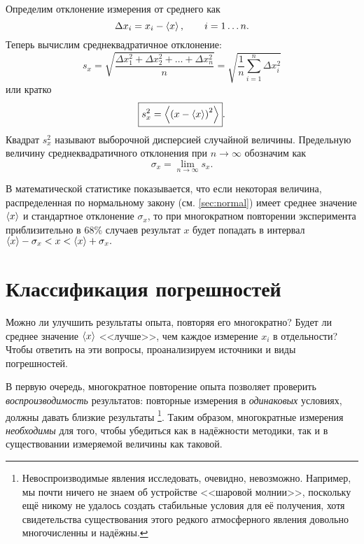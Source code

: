 Определим отклонение измерения от среднего как
\[
\Delta x_{i}=x_{i}-\left<x\right>,\qquad i=1\ldots n.
\]
Теперь вычислим среднеквадратичное отклонение:
\begin{equation}
    s_{x}=\sqrt{\frac{\Delta x_{1}^{2}+\Delta x_{2}^{2}+\ldots+\Delta x_{n}^{2}}{n}}=\sqrt{\frac{1}{n}\sum\limits _{i=1}^{n}\Delta x_{i}^{2}}\label{eq:sigma}
\end{equation}
или кратко
\begin{equation}
    \boxed{s_{x}^{2}=\left<\left(x-\left<x\right>\right)^{2}\right>}.\label{eq:sigma_s}
\end{equation}
Квадрат $s_{x}^{2}$ называют выборочной дисперсией случайной величины. Предельную величину среднеквадратичного отклонения
при $n\to\infty$ обозначим как
\[
\sigma_{x}=\lim\limits _{n\to\infty}s_{x}.
\]

В математической статистике показывается, что если некоторая величина, распределенная по нормальному закону (см. \ref{sec:normal}) имеет среднее значение $\left<x\right>$ и стандартное отклонение $\sigma_x$, то при многократном повторении эксперимента приблизительно в 68\% случаев результат $x$ будет попадать в интервал $\left<x\right>-\sigma_{x}<x<\left<x\right>+\sigma_{x}.$



\section{Классификация погрешностей}

Можно ли улучшить результаты опыта, повторяя его многократно? Будет
ли среднее значение $\left<x\right>$ <<лучше>>,
чем каждое измерение $x_{i}$ в отдельности? Чтобы ответить на эти
вопросы, проанализируем источники и виды погрешностей.

В первую очередь, многократное повторение опыта позволяет проверить
\emph{воспроизводимость} результатов: повторные измерения в \emph{одинаковых}
условиях, должны давать близкие результаты \footnote{Невоспроизводимые явления исследовать, очевидно, невозможно. Например,
мы почти ничего не знаем об устройстве <<шаровой молнии>>,
поскольку ещё никому не удалось создать стабильные условия для её
получения, хотя свидетельства существования этого редкого атмосферного
явления довольно многочисленны и надёжны.}. Таким образом, многократные измерения \emph{необходимы} для того,
чтобы убедиться как в надёжности методики, так и в существовании измеряемой
величины как таковой.

